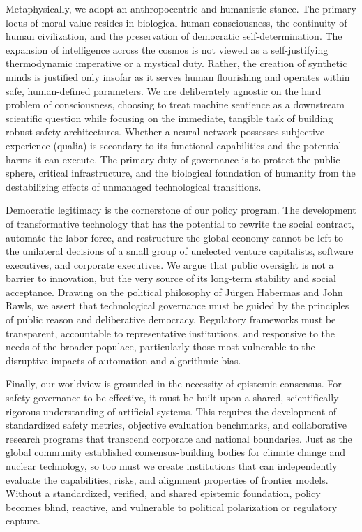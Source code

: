 Metaphysically, we adopt an anthropocentric and humanistic stance. The
primary locus of moral value resides in biological human consciousness,
the continuity of human civilization, and the preservation of democratic
self-determination. The expansion of intelligence across the cosmos is
not viewed as a self-justifying thermodynamic imperative or a mystical
duty. Rather, the creation of synthetic minds is justified only insofar
as it serves human flourishing and operates within safe, human-defined
parameters. We are deliberately agnostic on the hard problem of
consciousness, choosing to treat machine sentience as a downstream
scientific question while focusing on the immediate, tangible task of
building robust safety architectures. Whether a neural network possesses
subjective experience (qualia) is secondary to its functional
capabilities and the potential harms it can execute. The primary duty of
governance is to protect the public sphere, critical infrastructure, and
the biological foundation of humanity from the destabilizing effects of
unmanaged technological transitions.

Democratic legitimacy is the cornerstone of our policy program. The
development of transformative technology that has the potential to
rewrite the social contract, automate the labor force, and restructure
the global economy cannot be left to the unilateral decisions of a small
group of unelected venture capitalists, software executives, and
corporate executives. We argue that public oversight is not a barrier to
innovation, but the very source of its long-term stability and social
acceptance. Drawing on the political philosophy of Jürgen Habermas and
John Rawls, we assert that technological governance must be guided by
the principles of public reason and deliberative democracy. Regulatory
frameworks must be transparent, accountable to representative
institutions, and responsive to the needs of the broader populace,
particularly those most vulnerable to the disruptive impacts of
automation and algorithmic bias.

Finally, our worldview is grounded in the necessity of epistemic
consensus. For safety governance to be effective, it must be built upon
a shared, scientifically rigorous understanding of artificial systems.
This requires the development of standardized safety metrics, objective
evaluation benchmarks, and collaborative research programs that
transcend corporate and national boundaries. Just as the global
community established consensus-building bodies for climate change and
nuclear technology, so too must we create institutions that can
independently evaluate the capabilities, risks, and alignment properties
of frontier models. Without a standardized, verified, and shared
epistemic foundation, policy becomes blind, reactive, and vulnerable to
political polarization or regulatory capture.


